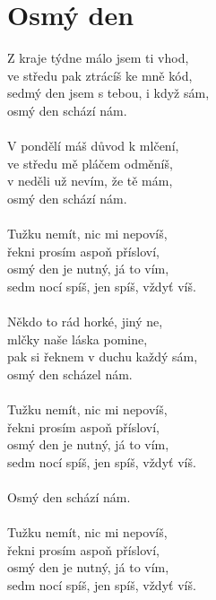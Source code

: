 \section{Osmý den}
Z kraje týdne málo jsem ti vhod,\\
ve středu pak ztrácíš ke mně kód,\\
sedmý den jsem s tebou, i když sám,\\
osmý den schází nám.\\
\\
V pondělí máš důvod k mlčení,\\
ve středu mě pláčem odměníš,\\
v neděli už nevím, že tě mám,\\
osmý den schází nám.\\
\\
Tužku nemít, nic mi nepovíš,\\
řekni prosím aspoň přísloví,\\
osmý den je nutný, já to vím,\\
sedm nocí spíš, jen spíš, vždyť víš.\\
\\
Někdo to rád horké, jiný ne,\\
mlčky naše láska pomine,\\
pak si řeknem v duchu každý sám,\\
osmý den scházel nám.\\
\\
Tužku nemít, nic mi nepovíš,\\
řekni prosím aspoň přísloví,\\
osmý den je nutný, já to vím,\\
sedm nocí spíš, jen spíš, vždyť víš.\\
\\
Osmý den schází nám.\\
\\
Tužku nemít, nic mi nepovíš,\\
řekni prosím aspoň přísloví,\\
osmý den je nutný, já to vím,\\
sedm nocí spíš, jen spíš, vždyť víš.\\